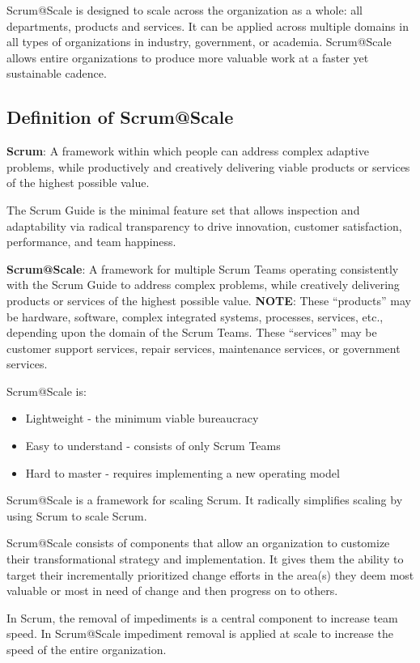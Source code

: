\documentclass[12pt,a4paper,parskip=full]{scrartcl}
\begin{document}
Scrum@Scale is designed to scale across the organization as a whole: all departments, products and services. It can be applied across multiple domains in all types of organizations in industry, government, or academia.  Scrum@Scale allows entire organizations to produce more valuable work at a faster yet sustainable cadence.

\subsection{Definition of Scrum@Scale}

\textbf{Scrum}: A framework within which people can address complex adaptive problems, while productively and creatively delivering viable products or services of the highest possible value.

The Scrum Guide is the minimal feature set that allows inspection and adaptability via radical transparency to drive innovation, customer satisfaction, performance, and team happiness.

\textbf{Scrum@Scale}: A framework for multiple Scrum Teams operating consistently with the Scrum Guide to address complex problems, while creatively delivering products or services of the highest possible value.
\textbf{NOTE}: These ``products'' may be hardware, software, complex integrated systems, processes, services, etc., depending upon the domain of the Scrum Teams.  These ``services'' may be customer support services, repair services, maintenance services, or government services.  

Scrum@Scale is:
\begin{itemize}
	\item Lightweight - the minimum viable bureaucracy
	\item Easy to understand - consists of only Scrum Teams
	\item Hard to master - requires implementing a new operating model
\end{itemize}

Scrum@Scale is a framework for scaling Scrum. It radically simplifies scaling by using Scrum to scale Scrum. 

Scrum@Scale consists of components that allow an organization to customize their transformational strategy and implementation. It gives them the ability to target their incrementally prioritized change efforts in the area(s) they deem most valuable or most in need of change and then progress on to others. 

In Scrum, the removal of impediments is a central component to increase team speed. In Scrum@Scale impediment removal is applied at scale to increase the speed of the entire organization.
\end{document}
